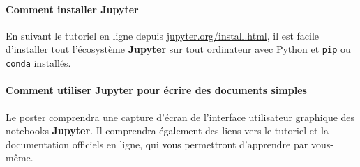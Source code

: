 \documentclass[runningheads]{llncs}
\newcommand{\Jupyter}{\textbf{Jupyter}}
\begin{document}
\paragraph{Comment installer \Jupyter{}}

En suivant le tutoriel en ligne depuis \url{jupyter.org/install.html}, il est facile d'installer tout l'écosystème \Jupyter{} sur tout ordinateur avec Python et \texttt{pip} ou \texttt{conda} installés.


\paragraph{Comment utiliser \Jupyter{} pour écrire des documents simples}

Le poster comprendra une capture d'écran de l'interface utilisateur graphique des notebooks \Jupyter{}.
Il comprendra également des liens vers le tutoriel et la documentation officiels en ligne, qui vous permettront d'apprendre par vous-même.






\end{document}
